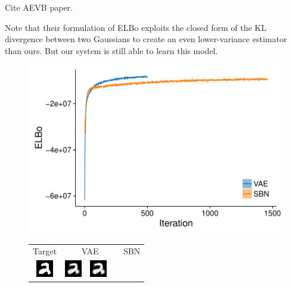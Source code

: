 Cite AEVB paper.

Note that their formulation of ELBo exploits the closed form of the KL divergence between two Gaussians to create an even lower-variance estimator than ours. But our system is still able to learn this model.

\begin{figure}
\begin{minipage}{0.5\linewidth}
\centering
\includegraphics[width=\linewidth]{figs/results/vae_sbn/elboProgress.pdf}
\end{minipage}
%
\hspace{2em}
%
\begin{minipage}{0.5\linewidth}
\setlength{\tabcolsep}{1pt}
\centering
\begin{tabular}{c  c c c c c c}
Target & \multicolumn{3}{c}{VAE} & \multicolumn{3}{c}{SBN}
\\
 \includegraphics[width=0.12\linewidth]{figs/results/vae_sbn/vae_encodeDecode_target_000.png}
 \hspace{3pt}
& \includegraphics[width=0.12\linewidth]{figs/results/vae_sbn/vae_encodeDecode_target_000_sample_001.png}
& \includegraphics[width=0.12\linewidth]{figs/results/vae_sbn/vae_encodeDecode_target_000_sample_002.png}

\end{tabular}
\end{minipage}
\end{figure}
